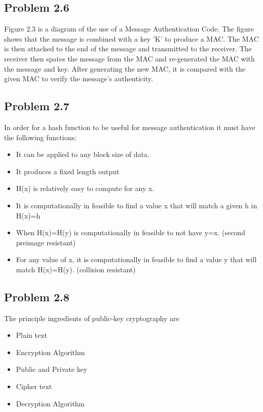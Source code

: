 \documentclass[12pt]{article}
\begin{document}
\subsection{Problem  2.6 \cite[p.~68]{stallings}}
Figure 2.3 is a diagram of the use of a Message Authentication Code. The figure shows that the message is combined with a key 'K' to produce a MAC. The MAC is then attached to the end of the message and transmitted to the receiver. The receiver then spates the message from the MAC and re-generated the MAC with the message and key. After generating the new MAC, it is compared with the given MAC to verify the message's authenticity.

\subsection{Problem  2.7 \cite[p.~68]{stallings}}
In order for a hash function to be useful for message authentication it must have the following functions:
\begin{itemize}
\item It can be applied to any block size of data.
\item It produces a fixed length output
\item H(x) is relatively easy to compute for any x.
\item It is computationally in feasible to find a value x that will match a given h in H(x)=h
\item When H(x)=H(y) is computationally in feasible to not have y=x. (second preimage resistant)
\item For any value of x, it is computationally in feasible to find a value y that will match H(x)=H(y). (collision resistant)
\end{itemize}

\subsection{Problem  2.8 \cite[p.~68]{stallings}}
The principle ingredients of public-key cryptography are 
\begin{itemize}
\item Plain text
\item Encryption Algorithm
\item Public and Private key
\item Cipher text
\item Decryption Algorithm 
\end{itemize} 
\end{document}
